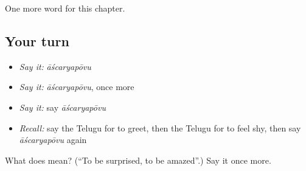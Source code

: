 \begin{grammarlens}[title={What you've built}]
One more word for this chapter.
\end{grammarlens}

\subsection*{Your turn}
\begin{itemize}
\raggedright
  \item \emph{Say it:} \emph{āścaryapōvu}
  \item \emph{Say it:} \emph{āścaryapōvu}, once more
  \item \emph{Say it:} say \emph{āścaryapōvu}
  \item \emph{Recall:} say the Telugu for to greet, then the Telugu for to feel shy, then say \emph{āścaryapōvu} again
\end{itemize}

\begin{tcolorbox}[breakable,colback=teal!4,colframe=teal!35!black,title={Before you move on}]
What does  mean? (\textquotedblleft{}To be surprised, to be amazed\textquotedblright{}.) Say it once more.
\end{tcolorbox}
